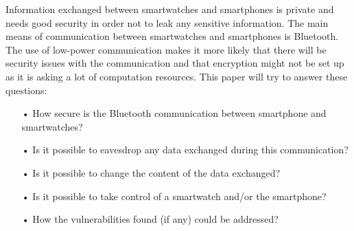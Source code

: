 Information exchanged between smartwatches and smartphones is private and needs good security in order not to leak any sensitive information. 
The main means of communication between smartwatches and smartphones is Bluetooth.
The use of low-power communication makes it more likely that there will be security issues with the communication and that encryption might not be set up as it is asking a lot of computation resources. 
This paper will try to answer these questions:
\begin{itemize}
\item[•] How secure is the Bluetooth communication between smartphone and smartwatches?
\item[•]Is it possible to eavesdrop any data exchanged during this communication?
\item[•]Is it possible to change the content of the data exchanged?
\item[•]Is it possible to take control of a smartwatch and/or the smartphone?
\item[•]How the vulnerabilities found (if any) could be addressed?
\end{itemize}

